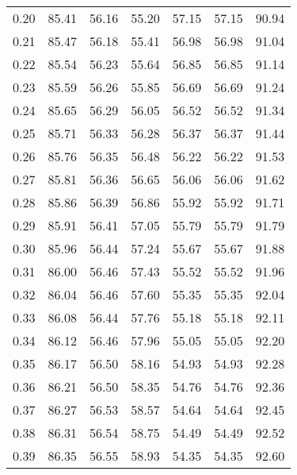 \begin{tabular}{|c|c|c|c|c|c|c|}
      0.20 &     85.41 &     56.16 &      55.20 &   57.15 &      57.15 &         90.94 \\
      0.21 &     85.47 &     56.18 &      55.41 &   56.98 &      56.98 &         91.04 \\
      0.22 &     85.54 &     56.23 &      55.64 &   56.85 &      56.85 &         91.14 \\
      0.23 &     85.59 &     56.26 &      55.85 &   56.69 &      56.69 &         91.24 \\
      0.24 &     85.65 &     56.29 &      56.05 &   56.52 &      56.52 &         91.34 \\
      0.25 &     85.71 &     56.33 &      56.28 &   56.37 &      56.37 &         91.44 \\
      0.26 &     85.76 &     56.35 &      56.48 &   56.22 &      56.22 &         91.53 \\
      0.27 &     85.81 &     56.36 &      56.65 &   56.06 &      56.06 &         91.62 \\
      0.28 &     85.86 &     56.39 &      56.86 &   55.92 &      55.92 &         91.71 \\
      0.29 &     85.91 &     56.41 &      57.05 &   55.79 &      55.79 &         91.79 \\
      0.30 &     85.96 &     56.44 &      57.24 &   55.67 &      55.67 &         91.88 \\
      0.31 &     86.00 &     56.46 &      57.43 &   55.52 &      55.52 &         91.96 \\
      0.32 &     86.04 &     56.46 &      57.60 &   55.35 &      55.35 &         92.04 \\
      0.33 &     86.08 &     56.44 &      57.76 &   55.18 &      55.18 &         92.11 \\
      0.34 &     86.12 &     56.46 &      57.96 &   55.05 &      55.05 &         92.20 \\
      0.35 &     86.17 &     56.50 &      58.16 &   54.93 &      54.93 &         92.28 \\
      0.36 &     86.21 &     56.50 &      58.35 &   54.76 &      54.76 &         92.36 \\
      0.37 &     86.27 &     56.53 &      58.57 &   54.64 &      54.64 &         92.45 \\
      0.38 &     86.31 &     56.54 &      58.75 &   54.49 &      54.49 &         92.52 \\
      0.39 &     86.35 &     56.55 &      58.93 &   54.35 &      54.35 &         92.60 \\

\end{tabular}
